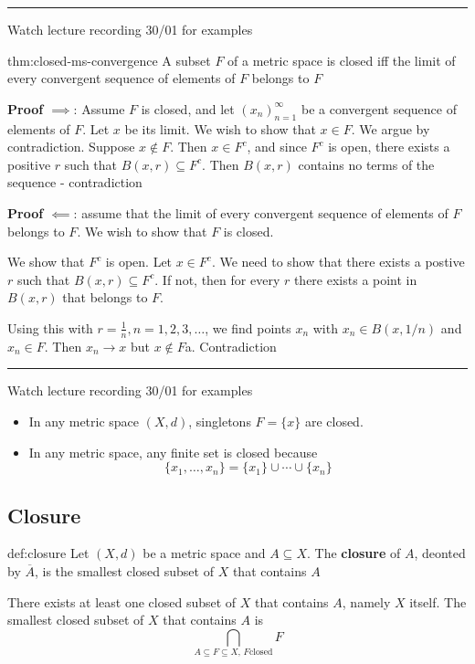 \documentclass{article}
\begin{document}
\noindent\rule{\textwidth}{0.2pt}
Watch lecture recording 30/01 for examples


\begin{thm}[]{thm:closed-ms-convergence}{}
    A subset $F$ of a metric space is closed iff the limit of every convergent sequence of elements of $F$ belongs to $F$
\end{thm}

\textbf{Proof $\implies$}: Assume $F$ is closed, and let $(x_{n})^{\infty}_{n=1}$ be a convergent sequence of elements of $F$. Let $x$ be its limit. We wish to show that $x\in F$. We argue by contradiction. Suppose $x\not\in F$. Then $x\in F^{c}$, and since $F^{c}$ is open, there exists a positive $r$ such that $B(x,r) \subseteq F^{c}$. Then $B(x,r)$ contains no terms of the sequence - contradiction

\textbf{Proof $\impliedby$}: assume that the limit of every convergent sequence of elements of $F$ belongs to $F$. We wish to show that $F$ is closed.

We show that $F^{c}$ is open. Let $x\in F^{c}$. We need to show that there exists a postive $r$ such that $B(x,r)\subseteq F^{c}$. If not, then for every $r$ there exists a point in $B(x,r)$ that belongs to $F$.

Using this with $r = \frac{1}{n}, n=1,2,3,\dots$, we find points $x_{n}$ with $x_{n}\in B(x, 1 / n)$ and $x_{n}\in F$. Then $x_{n}\to x$ but $x\not\in F$a. Contradiction

\noindent\rule{\textwidth}{0.2pt}
Watch lecture recording 30/01 for examples

\begin{itemize}
    \item In any metric space $(X,d)$, singletons $F = \{x\}$ are closed.
    \item In any metric space, any finite set is closed because
        \[\{x_{1},\dots,x_{n}\} = \{x_{1}\}\cup \cdots \cup \{x_{n}\}\]
\end{itemize}


\subsection{Closure}

\begin{dfn}[Closure]{def:closure}{}
    Let $(X, d)$ be a metric space and $A \subseteq X$. The \textbf{closure} of $A$, deonted by $\overline{A}$, is the smallest closed subset of $X$ that contains $A$

    There exists at least one closed subset of $X$ that contains $A$, namely $X$ itself. The smallest closed subset of $X$ that contains $A$ is
    \[\bigcap\limits_{A \subseteq F \subseteq X,\,F \text{closed}} F\]
\end{dfn}
\end{document}
